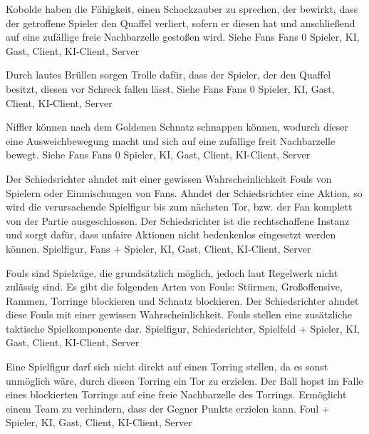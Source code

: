         {Kobolde haben die Fähigkeit, einen Schockzauber zu sprechen, der bewirkt, dass der getroffene Spieler den Quaffel verliert, sofern er diesen hat und anschließend auf eine zufällige freie Nachbarzelle gestoßen wird.}
        {Siehe Fans}
        {Fans}
        {0}
        {Spieler, KI, Gast, Client, KI-Client, Server}

        {Durch lautes Brüllen sorgen Trolle dafür, dass der Spieler, der den Quaffel besitzt, diesen vor Schreck fallen lässt.}
        {Siehe Fans}
        {Fans}
        {0}
        {Spieler, KI, Gast, Client, KI-Client, Server}

        {Niffler können nach dem Goldenen Schnatz schnappen können, wodurch dieser eine Ausweichbewegung macht und sich auf eine zufällige freit Nachbarzelle bewegt.}
        {Siehe Fans}
        {Fans}
        {0}
        {Spieler, KI, Gast, Client, KI-Client, Server}
        
        {Der Schiedsrichter ahndet mit einer gewissen Wahrscheinlichkeit Fouls von Spielern oder Einmischungen von Fans. Ahndet der Schiedsrichter eine Aktion, so wird die verursachende Spielfigur bis zum nächsten Tor, bzw. der Fan komplett von der Partie ausgeschlossen.}
        {Der Schiedsrichter ist die rechtschaffene Instanz und sorgt dafür, dass unfaire Aktionen nicht bedenkenlos eingesetzt werden können.}
        {Spielfigur, Fans}
        {+}
        {Spieler, KI, Gast, Client, KI-Client, Server}

        {Fouls sind Spielzüge, die grundsätzlich möglich, jedoch laut Regelwerk nicht zulässig sind. Es gibt die folgenden Arten von Fouls: Stürmen, Großoffensive, Rammen, Torringe blockieren und Schnatz blockieren. Der Schiedsrichter ahndet diese Fouls mit einer gewissen Wahrscheinlichkeit.}
        {Fouls stellen eine zusätzliche taktische Spielkomponente dar.}
        {Spielfigur, Schiedsrichter, Spielfeld}
        {+}
        {Spieler, KI, Gast, Client, KI-Client, Server}

        {Eine Spielfigur darf sich nicht direkt auf einen Torring stellen, da es sonst unmöglich wäre, durch diesen Torring ein Tor zu erzielen. Der Ball hopst im Falle eines blockierten Torrings auf eine freie Nachbarzelle des Torrings.}
        {Ermöglicht einem Team zu verhindern, dass der Gegner Punkte erzielen kann.}
        {Foul}
        {+}
        {Spieler, KI, Gast, Client, KI-Client, Server}

